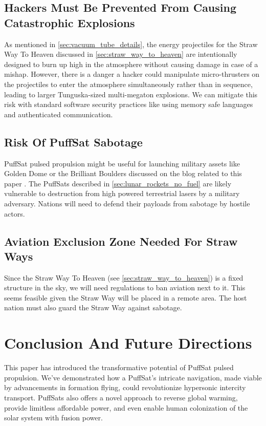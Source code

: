 \documentclass{article}
\begin{document}
\subsection{Hackers Must Be Prevented From Causing Catastrophic Explosions}
As mentioned in \autoref{sec:vacuum_tube_details}, the energy projectiles for the Straw Way To Heaven discussed in \autoref{sec:straw_way_to_heaven} are intentionally designed to burn up high in the atmosphere without causing damage in case of a mishap.  However, there is a danger a hacker could manipulate micro-thrusters on the projectiles to enter the atmosphere simultaneously rather than in sequence, leading to larger Tunguska-sized \cite{longo2007tunguska}  multi-megaton explosions.  We can mitigate this risk with standard software security practices like using memory safe languages and authenticated communication.

\subsection{Risk Of PuffSat Sabotage}
PuffSat pulsed propulsion might be useful for launching military assets like Golden Dome \cite{lockheed_martin_golden_dome} or the Brilliant Boulders \cite{brilliant_boulders} discussed on the blog related to this paper \cite{aim2024}.   The PuffSats described in \autoref{sec:lunar_rockets_no_fuel} are likely vulnerable to destruction from high powered terrestrial lasers by a military adversary.  Nations will need to defend their payloads from sabotage by hostile actors.

\subsection{Aviation Exclusion Zone Needed For Straw Ways}
Since the Straw Way To Heaven (see \autoref{sec:straw_way_to_heaven}) is a fixed structure in the sky, we will need regulations to ban aviation next to it.   This seems feasible given the Straw Way will be placed in a remote area.   The host nation must also guard the Straw Way against sabotage.


\section{Conclusion And Future Directions}
This paper has introduced the transformative potential of PuffSat pulsed propulsion. We've demonstrated how a PuffSat's intricate navigation, made viable by advancements in formation flying, could revolutionize hypersonic intercity transport.  PuffSats also offers a novel approach to reverse global warming, provide limitless affordable power, and even enable human colonization of the solar system with fusion power. 
\end{document}

